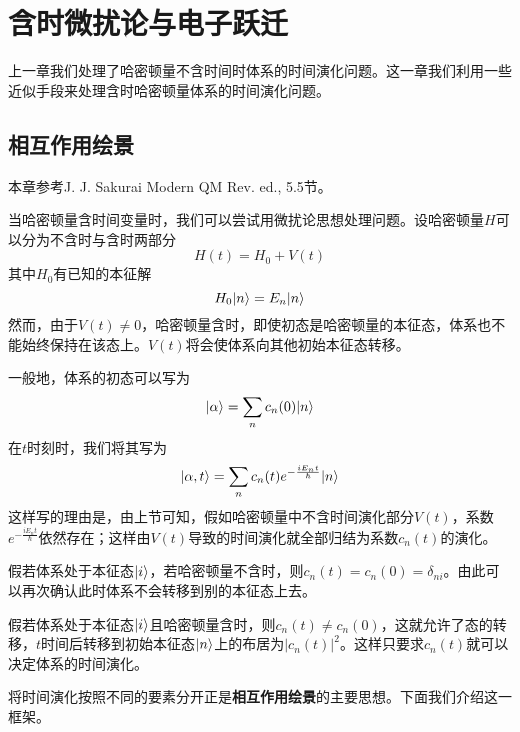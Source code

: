 
\chapter{含时微扰论与电子跃迁}
\label{cpt:2}
上一章我们处理了哈密顿量不含时间时体系的时间演化问题。这一章我们利用一些近似手段来处理含时哈密顿量体系的时间演化问题。
\section{相互作用绘景}
\begin{framed}
	本章参考J. J. Sakurai Modern QM Rev. ed., 5.5节。
\end{framed}
当哈密顿量含时间变量时，我们可以尝试用微扰论思想处理问题。设哈密顿量$ H $可以分为不含时与含时两部分
\begin{equation}\label{key}
H(t)=H_0+V(t)
\end{equation}
其中$ H_0 $有已知的本征解
\begin{equation}\label{key}
H_0|n\rangle=E_n|n\rangle
\end{equation}
然而，由于$ V(t)\neq 0 $，哈密顿量含时，即使初态是哈密顿量的本征态，体系也不能始终保持在该态上。$ V(t) $将会使体系向其他初始本征态转移。

一般地，体系的初态可以写为
\begin{equation}\label{key}
|\alpha\rangle=\sum_nc_n(0)|n\rangle
\end{equation}
在$ t $时刻时，我们将其写为
\begin{equation}\label{key}
|\alpha,t\rangle=\sum_nc_n(t)e^{-\frac{iE_nt}{\hbar}}|n\rangle
\end{equation}
这样写的理由是，由上节可知，假如哈密顿量中不含时间演化部分$ V(t) $，系数$ e^{-\frac{iE_nt}{\hbar}} $依然存在；这样由$ V(t) $导致的时间演化就全部归结为系数$ c_n(t) $的演化。

假若体系处于本征态$ |i\rangle $，若哈密顿量不含时，则$ c_n(t)=c_n(0)=\delta_{ni} $。由此可以再次确认此时体系不会转移到别的本征态上去。

假若体系处于本征态$ |i\rangle $且哈密顿量含时，则$ c_n(t)\neq c_n(0)$，这就允许了态的转移，$ t $时间后转移到初始本征态$ |n\rangle $上的布居为$ |c_n(t)|^2 $。这样只要求$ c_n(t) $就可以决定体系的时间演化。

将时间演化按照不同的要素分开正是\textbf{相互作用绘景}的主要思想。下面我们介绍这一框架。


